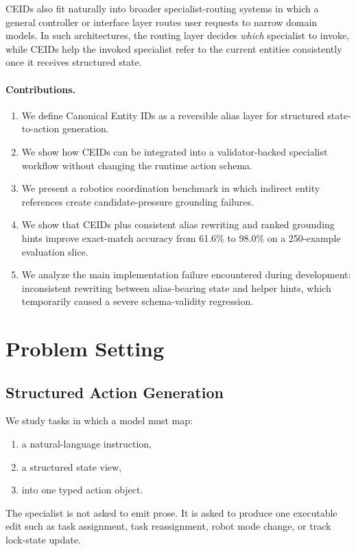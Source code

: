\documentclass[manuscript,screen,review]{jair}
\begin{document}
CEIDs also fit naturally into broader specialist-routing systems in which a general controller or interface layer routes user requests to narrow domain models. In such architectures, the routing layer decides \emph{which} specialist to invoke, while CEIDs help the invoked specialist refer to the current entities consistently once it receives structured state.

\paragraph{Contributions.}
\begin{enumerate}[leftmargin=*,itemsep=0.3em]
  \item We define Canonical Entity IDs as a reversible alias layer for structured state-to-action generation.
  \item We show how CEIDs can be integrated into a validator-backed specialist workflow without changing the runtime action schema.
  \item We present a robotics coordination benchmark in which indirect entity references create candidate-pressure grounding failures.
  \item We show that CEIDs plus consistent alias rewriting and ranked grounding hints improve exact-match accuracy from 61.6\% to 98.0\% on a 250-example evaluation slice.
  \item We analyze the main implementation failure encountered during development: inconsistent rewriting between alias-bearing state and helper hints, which temporarily caused a severe schema-validity regression.
\end{enumerate}

\section{Problem Setting}
\subsection{Structured Action Generation}
We study tasks in which a model must map:
\begin{enumerate}[leftmargin=*,itemsep=0.25em]
  \item a natural-language instruction,
  \item a structured state view,
  \item into one typed action object.
\end{enumerate}

The specialist is not asked to emit prose. It is asked to produce one executable edit such as task assignment, task reassignment, robot mode change, or track lock-state update.
\end{document}
